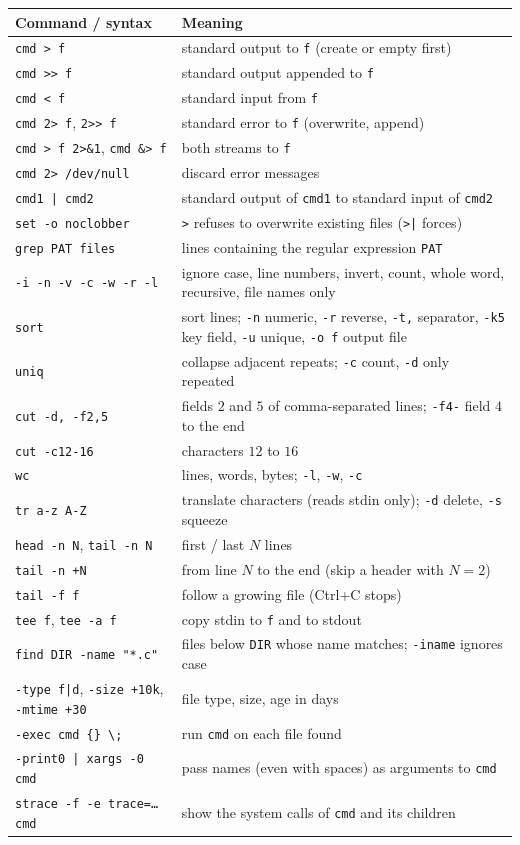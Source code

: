 \documentclass[11pt,a4paper]{article}
\newcommand{\cmd}[1]{\texttt{#1}}
\begin{document}
{\footnotesize
\renewcommand{\arraystretch}{1.2}
\begin{longtable}{@{}p{4.6cm}p{10.9cm}@{}}
\toprule
\textbf{Command / syntax} & \textbf{Meaning}\\
\midrule
\endhead
\cmd{cmd > f} & standard output to \texttt{f} (create or empty first)\\
\cmd{cmd >> f} & standard output appended to \texttt{f}\\
\cmd{cmd < f} & standard input from \texttt{f}\\
\cmd{cmd 2> f}, \cmd{2>> f} & standard error to \texttt{f} (overwrite, append)\\
\cmd{cmd > f 2>\&1}, \cmd{cmd \&> f} & both streams to \texttt{f}\\
\cmd{cmd 2> /dev/null} & discard error messages\\
\cmd{cmd1 | cmd2} & standard output of \texttt{cmd1} to standard input of \texttt{cmd2}\\
\cmd{set -o noclobber} & \cmd{>} refuses to overwrite existing files (\cmd{>|} forces)\\
\midrule
\cmd{grep PAT files} & lines containing the regular expression \texttt{PAT}\\
\quad \cmd{-i -n -v -c -w -r -l} & ignore case, line numbers, invert, count, whole word, recursive, file names only\\
\cmd{sort} & sort lines; \cmd{-n} numeric, \cmd{-r} reverse, \cmd{-t,} separator, \cmd{-k5} key field, \cmd{-u} unique, \cmd{-o f} output file\\
\cmd{uniq} & collapse adjacent repeats; \cmd{-c} count, \cmd{-d} only repeated\\
\cmd{cut -d, -f2,5} & fields $2$ and $5$ of comma-separated lines; \cmd{-f4-} field $4$ to the end\\
\cmd{cut -c12-16} & characters $12$ to $16$\\
\cmd{wc} & lines, words, bytes; \cmd{-l}, \cmd{-w}, \cmd{-c}\\
\cmd{tr a-z A-Z} & translate characters (reads stdin only); \cmd{-d} delete, \cmd{-s} squeeze\\
\cmd{head -n N}, \cmd{tail -n N} & first / last $N$ lines\\
\cmd{tail -n +N} & from line $N$ to the end (skip a header with $N = 2$)\\
\cmd{tail -f f} & follow a growing file (Ctrl+C stops)\\
\cmd{tee f}, \cmd{tee -a f} & copy stdin to \texttt{f} and to stdout\\
\midrule
\cmd{find DIR -name "*.c"} & files below \texttt{DIR} whose name matches; \cmd{-iname} ignores case\\
\quad \cmd{-type f|d}, \cmd{-size +10k}, \cmd{-mtime +30} & file type, size, age in days\\
\quad \cmd{-exec cmd \{\} \textbackslash;} & run \texttt{cmd} on each file found\\
\quad \cmd{-print0 | xargs -0 cmd} & pass names (even with spaces) as arguments to \texttt{cmd}\\
\cmd{strace -f -e trace=\dots{} cmd} & show the system calls of \texttt{cmd} and its children\\
\bottomrule
\end{longtable}
}
\end{document}
